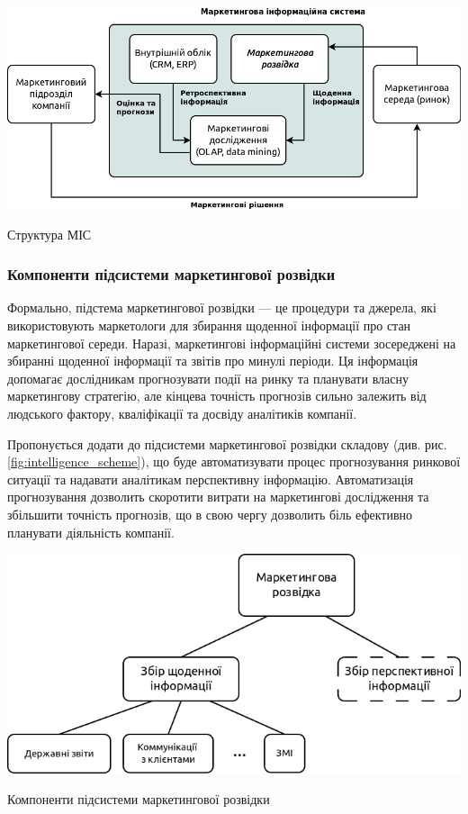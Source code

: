 \begin{stdfigure}
\includegraphics[width=7in]{images/mis_structure.png}
\caption{Структура МІС}
\label{fig:mis_structure}
\end{stdfigure}    

\subsubsection{Компоненти підсистеми маркетингової розвідки}
Формально, підстема маркетингової розвідки --- це процедури та джерела, які використовують маркетологи для збирання щоденної інформації про стан маркетингової середи\cite{kotler14}. Наразі, маркетингові інформаційні системи зосереджені на збиранні щоденної інформації та звітів про минулі періоди. Ця інформація допомагає дослідникам прогнозувати події на ринку та планувати власну маркетингову стратегію, але кінцева точність прогнозів сильно залежить від людського фактору, кваліфікації та досвіду аналітиків компанії.

Пропонується додати до підсистеми маркетингової розвідки складову (див. рис. \ref{fig:intelligence_scheme}), що буде автоматизувати процес прогнозування ринкової ситуації та надавати аналітикам перспективну інформацію. Автоматизація прогнозування дозволить скоротити витрати на маркетингові дослідження та збільшити точність прогнозів, що в свою чергу дозволить біль ефективно планувати діяльність компанії.

\begin{stdfigure}
\includegraphics[width=7in]{images/intelligence_scheme.png}
\caption{Компоненти підсистеми маркетингової розвідки}
\label{fig:intelligence_scheme}
\end{stdfigure}    

